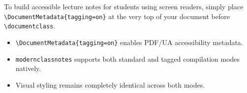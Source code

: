 \documentclass[mode=notes, palette=ocean, fontsize=11pt]{modernclassnotes}
\begin{document}
\begin{tip}
To build accessible lecture notes for students using screen readers, simply place \texttt{\textbackslash DocumentMetadata\{tagging=on\}} at the very top of your document before \texttt{\textbackslash documentclass}.
\end{tip}

\begin{takeaways}
\begin{itemize}
    \item \texttt{\textbackslash DocumentMetadata\{tagging=on\}} enables PDF/UA accessibility metadata.
    \item \texttt{modernclassnotes} supports both standard and tagged compilation modes natively.
    \item Visual styling remains completely identical across both modes.
\end{itemize}
\end{takeaways}
\end{document}
